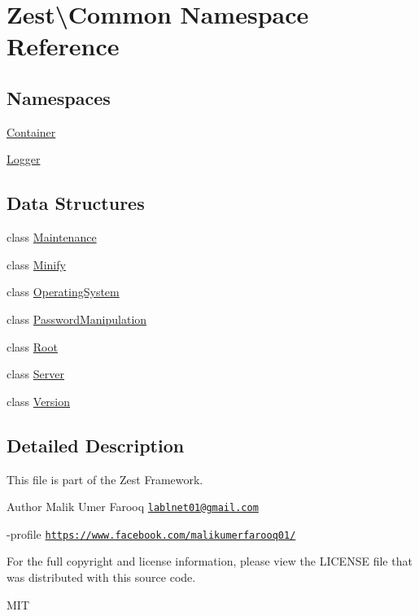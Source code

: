 \hypertarget{namespace_zest_1_1_common}{}\section{Zest\textbackslash{}Common Namespace Reference}
\label{namespace_zest_1_1_common}
\subsection*{Namespaces}
\begin{DoxyCompactItemize}
\item 
 \mbox{\hyperlink{namespace_zest_1_1_common_1_1_container}{Container}}
\item 
 \mbox{\hyperlink{namespace_zest_1_1_common_1_1_logger}{Logger}}
\end{DoxyCompactItemize}
\subsection*{Data Structures}
\begin{DoxyCompactItemize}
\item 
class \mbox{\hyperlink{class_zest_1_1_common_1_1_maintenance}{Maintenance}}
\item 
class \mbox{\hyperlink{class_zest_1_1_common_1_1_minify}{Minify}}
\item 
class \mbox{\hyperlink{class_zest_1_1_common_1_1_operating_system}{Operating\+System}}
\item 
class \mbox{\hyperlink{class_zest_1_1_common_1_1_password_manipulation}{Password\+Manipulation}}
\item 
class \mbox{\hyperlink{class_zest_1_1_common_1_1_root}{Root}}
\item 
class \mbox{\hyperlink{class_zest_1_1_common_1_1_server}{Server}}
\item 
class \mbox{\hyperlink{class_zest_1_1_common_1_1_version}{Version}}
\end{DoxyCompactItemize}


\subsection{Detailed Description}
This file is part of the Zest Framework.

\begin{DoxyAuthor}{Author}
Malik Umer Farooq \href{mailto:lablnet01@gmail.com}{\tt lablnet01@gmail.\+com} 

-\/profile \href{https://www.facebook.com/malikumerfarooq01/}{\tt https\+://www.\+facebook.\+com/malikumerfarooq01/}
\end{DoxyAuthor}
For the full copyright and license information, please view the L\+I\+C\+E\+N\+SE file that was distributed with this source code.

M\+IT 